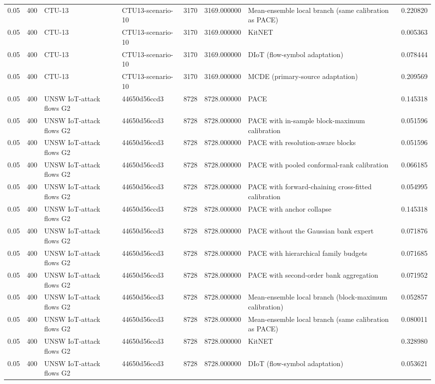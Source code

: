 \begin{tabular}{llllllll}
0.05 & 400 & CTU-13 & CTU13-scenario-10 & 3170 & 3169.000000 & Mean-ensemble local branch (same calibration as PACE) & 0.220820 \\
0.05 & 400 & CTU-13 & CTU13-scenario-10 & 3170 & 3169.000000 & KitNET & 0.005363 \\
0.05 & 400 & CTU-13 & CTU13-scenario-10 & 3170 & 3169.000000 & DIoT (flow-symbol adaptation) & 0.078444 \\
0.05 & 400 & CTU-13 & CTU13-scenario-10 & 3170 & 3169.000000 & MCDE (primary-source adaptation) & 0.209569 \\
0.05 & 400 & UNSW IoT-attack flows G2 & 44650d56ccd3 & 8728 & 8728.000000 & PACE & 0.145318 \\
0.05 & 400 & UNSW IoT-attack flows G2 & 44650d56ccd3 & 8728 & 8728.000000 & PACE with in-sample block-maximum calibration & 0.051596 \\
0.05 & 400 & UNSW IoT-attack flows G2 & 44650d56ccd3 & 8728 & 8728.000000 & PACE with resolution-aware blocks & 0.051596 \\
0.05 & 400 & UNSW IoT-attack flows G2 & 44650d56ccd3 & 8728 & 8728.000000 & PACE with pooled conformal-rank calibration & 0.066185 \\
0.05 & 400 & UNSW IoT-attack flows G2 & 44650d56ccd3 & 8728 & 8728.000000 & PACE with forward-chaining cross-fitted calibration & 0.054995 \\
0.05 & 400 & UNSW IoT-attack flows G2 & 44650d56ccd3 & 8728 & 8728.000000 & PACE with anchor collapse & 0.145318 \\
0.05 & 400 & UNSW IoT-attack flows G2 & 44650d56ccd3 & 8728 & 8728.000000 & PACE without the Gaussian bank expert & 0.071876 \\
0.05 & 400 & UNSW IoT-attack flows G2 & 44650d56ccd3 & 8728 & 8728.000000 & PACE with hierarchical family budgets & 0.071685 \\
0.05 & 400 & UNSW IoT-attack flows G2 & 44650d56ccd3 & 8728 & 8728.000000 & PACE with second-order bank aggregation & 0.071952 \\
0.05 & 400 & UNSW IoT-attack flows G2 & 44650d56ccd3 & 8728 & 8728.000000 & Mean-ensemble local branch (block-maximum calibration) & 0.052857 \\
0.05 & 400 & UNSW IoT-attack flows G2 & 44650d56ccd3 & 8728 & 8728.000000 & Mean-ensemble local branch (same calibration as PACE) & 0.080011 \\
0.05 & 400 & UNSW IoT-attack flows G2 & 44650d56ccd3 & 8728 & 8728.000000 & KitNET & 0.328980 \\
0.05 & 400 & UNSW IoT-attack flows G2 & 44650d56ccd3 & 8728 & 8728.000000 & DIoT (flow-symbol adaptation) & 0.053621 \\

\end{tabular}
